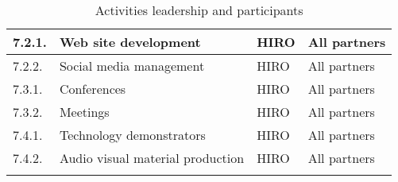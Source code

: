 \begin{longtable}[H]{p{1.5cm} >{\raggedright\arraybackslash}p{4cm} >{\raggedright\arraybackslash}p{3.8cm} >{\raggedright\arraybackslash}p{4cm}}
	\midrule
	
	7.2.1. & Web site development & HIRO & All partners\vspace{0.2cm} \\
	
	\midrule
	
	7.2.2. & Social media management & HIRO & All partners\vspace{0.2cm} \\
	
	\midrule
	
	7.3.1. & Conferences & HIRO & All partners\vspace{0.2cm} \\
	
	\midrule
	
	7.3.2. & Meetings & HIRO & All partners\vspace{0.2cm} \\
	
	\midrule
	
	7.4.1. & Technology demonstrators & HIRO & All partners\vspace{0.2cm} \\
	
	\midrule
	
	7.4.2. & Audio visual material production & HIRO & All partners\vspace{0.2cm} \\
	
	\bottomrule[2pt]
	
\caption{Activities leadership and participants}
\end{longtable}